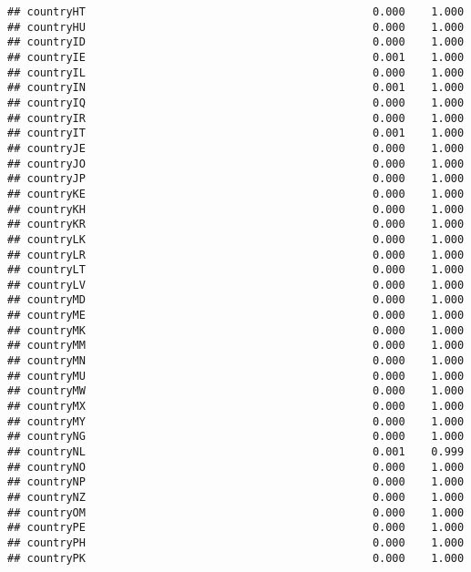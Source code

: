 \documentclass[
]{article}
\begin{document}
\begin{verbatim}
## countryHT                                            0.000    1.000
## countryHU                                            0.000    1.000
## countryID                                            0.000    1.000
## countryIE                                            0.001    1.000
## countryIL                                            0.000    1.000
## countryIN                                            0.001    1.000
## countryIQ                                            0.000    1.000
## countryIR                                            0.000    1.000
## countryIT                                            0.001    1.000
## countryJE                                            0.000    1.000
## countryJO                                            0.000    1.000
## countryJP                                            0.000    1.000
## countryKE                                            0.000    1.000
## countryKH                                            0.000    1.000
## countryKR                                            0.000    1.000
## countryLK                                            0.000    1.000
## countryLR                                            0.000    1.000
## countryLT                                            0.000    1.000
## countryLV                                            0.000    1.000
## countryMD                                            0.000    1.000
## countryME                                            0.000    1.000
## countryMK                                            0.000    1.000
## countryMM                                            0.000    1.000
## countryMN                                            0.000    1.000
## countryMU                                            0.000    1.000
## countryMW                                            0.000    1.000
## countryMX                                            0.000    1.000
## countryMY                                            0.000    1.000
## countryNG                                            0.000    1.000
## countryNL                                            0.001    0.999
## countryNO                                            0.000    1.000
## countryNP                                            0.000    1.000
## countryNZ                                            0.000    1.000
## countryOM                                            0.000    1.000
## countryPE                                            0.000    1.000
## countryPH                                            0.000    1.000
## countryPK                                            0.000    1.000

\end{verbatim}
\end{document}
